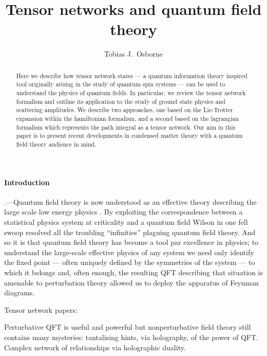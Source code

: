 \documentclass[prl,twocolumn,lengthcheck,superscriptaddress]{revtex4-1}
\theoremstyle{definition}
\theoremstyle{remark}
\begin{document}
\title{Tensor networks and quantum field theory}

\author{Tobias J.\ Osborne}

\begin{abstract}
	Here we describe how tensor network states --- a quantum information theory inspired tool originally arising in the study of quantum spin systems --- can be used to understand the physics of quantum fields. In particular, we review the tensor network formalism and outline its application to the study of ground state physics and scattering amplitudes. We describe two approaches, one based on the Lie-Trotter expansion within the hamiltonian formalism, and a second based on the lagrangian formalism which represents the path integral as a tensor network. Our aim in this paper is to present recent developments in condensed matter theory with a quantum field theory audience in mind. 
\end{abstract}

\maketitle

\paragraph{Introduction }\hspace{-1em}.---Quantum field theory is now understood as an effective theory describing the large scale low energy physics \cite{wilson:1975a,wilson:1974a}. By exploiting the correspondence between a statistical physics system at criticality and a quantum field Wilson in one fell swoop resolved all the troubling ``infinities'' plaguing quantum field theory. And so it is that quantum field theory has become a tool par excellence in physics; to understand the large-scale effective physics of any system we need only identify the fixed point --- often uniquely defined by the symmetries of the system --- to which it belongs and, often enough, the resulting QFT describing that situation is amenable to perturbation theory allowed us to deploy the apparatus of Feynman diagrams. 

Tensor network papers: \cite{perez-garcia:2006a}\cite{orus:2013a, evenbly:2011a, evenbly:2009a}\cite{verstraete:2004a}
\cite{vidal:2007a}\cite{levin:2007a}\cite{gu:2009a}


Perturbative QFT is useful and powerful but nonperturbative field theory still contains many mysteries: tantalising hints, via holography, of the power of QFT. Complex network of relationships via holographic duality.
\end{document}
